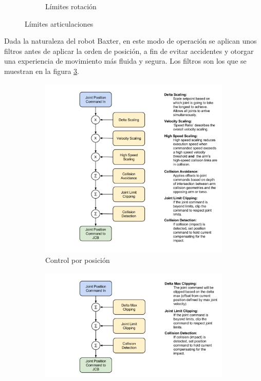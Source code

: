 \begin{figure}[tbh]
\begin{subfigure}[b]{0.4\textwidth}
		\caption{Límites rotación}
		\label{fig:metodos/limits2}
	\end{subfigure}
	\caption{Límites articulaciones}
	\label{fig:metodos/limits}
\end{figure}

Dada la naturaleza del robot Baxter, en este modo de operación se aplican unos filtros antes de aplicar la orden de posición, a fin de evitar accidentes y otorgar una experiencia de movimiento más fluida y segura. Los filtros son los que se muestran en la figura \ref{fig:metodos/position_filters}.

\begin{figure}[]
	\centering
	\begin{subfigure}[b]{0.24\textwidth}
		\includegraphics[trim=0 0 235 0, clip, width=\textwidth]{imagenes/metodos/baxter_position_filters.png}
		\caption{Control por posición}
		\label{fig:metodos/position_filters}
	\end{subfigure}
	\begin{subfigure}[b]{0.24\textwidth}
		\centering
		\includegraphics[trim=0 0 230 0, clip, width=\textwidth]{imagenes/metodos/baxter_position_raw_filters.png}

\end{subfigure}
\end{figure}
